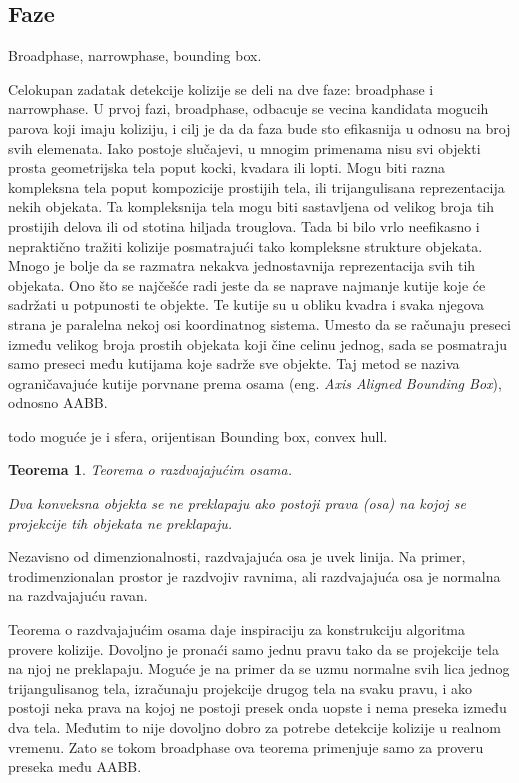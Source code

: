 \documentclass[a4paper]{article}
\newtheorem{teo}{Teorema}[section]
\begin{document}
{\subsection{Faze}
Broadphase, narrowphase, bounding box.

Celokupan zadatak detekcije kolizije se deli na dve faze: broadphase i narrowphase. 
U prvoj fazi, broadphase, odbacuje se vecina kandidata mogucih parova koji imaju koliziju, i cilj je da 
da faza bude sto efikasnija u odnosu na broj svih elemenata.
Iako postoje slučajevi, u mnogim primenama nisu svi objekti prosta geometrijska tela poput kocki, kvadara ili lopti.
Mogu biti razna kompleksna tela poput kompozicije prostijih tela, ili trijangulisana reprezentacija 
nekih objekata. Ta kompleksnija tela mogu biti sastavljena od velikog broja tih prostijih delova ili
od stotina hiljada trouglova. Tada bi bilo vrlo neefikasno i nepraktično tražiti kolizije posmatrajući
tako kompleksne strukture objekata. Mnogo je bolje da se razmatra nekakva jednostavnija reprezentacija svih 
tih objekata. Ono što se najčešće radi jeste da se naprave najmanje kutije koje će sadržati u potpunosti te objekte.
Te kutije su u obliku kvadra i svaka njegova strana je paralelna nekoj osi koordinatnog sistema. 
Umesto da se računaju preseci između velikog broja prostih objekata koji čine celinu jednog, sada se posmatraju 
samo preseci među kutijama koje sadrže sve objekte. Taj metod se naziva ograničavajuće kutije
porvnane prema osama (eng. {\em Axis Aligned Bounding Box}), odnosno AABB.

todo moguće je i sfera, orijentisan Bounding box, convex hull.

\begin{teo}
	Teorema o razdvajajućim osama. 

	Dva konveksna objekta se ne preklapaju ako postoji prava (osa) na kojoj se projekcije 
	tih objekata ne preklapaju. 
\end{teo}
Nezavisno od dimenzionalnosti, razdvajajuća osa je uvek linija. Na primer, trodimenzionalan prostor
je razdvojiv ravnima, ali razdvajajuća osa je normalna na razdvajajuću ravan.

Teorema o razdvajajućim osama daje inspiraciju za konstrukciju algoritma provere kolizije.
Dovoljno je pronaći samo jednu pravu tako da se  projekcije tela na njoj ne preklapaju.
Moguće je na primer da se uzmu normalne svih lica jednog trijangulisanog tela, izračunaju projekcije drugog 
tela na svaku pravu, i ako postoji neka prava na kojoj ne postoji presek onda uopste i nema preseka između
dva tela. Međutim to nije dovoljno dobro za potrebe detekcije kolizije u realnom vremenu. Zato se tokom 
broadphase ova teorema primenjuje samo za proveru preseka među AABB.

}
\end{document}
